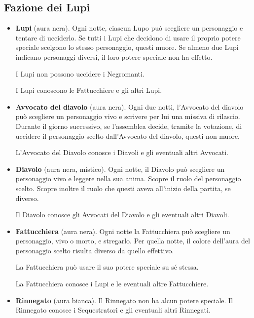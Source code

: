 \documentclass[a4paper,10pt]{article}
\begin{document}
\subsection*{Fazione dei Lupi}

\begin{itemize}
 \item {\bf Lupi} (aura nera). Ogni notte, ciascun Lupo può scegliere un personaggio e tentare di ucciderlo.
 Se tutti i Lupi che decidono di usare il proprio potere speciale scelgono lo stesso personaggio, questi muore.
 Se almeno due Lupi indicano personaggi diversi, il loro potere speciale non ha effetto.
 
 I Lupi non possono uccidere i Negromanti.
 
 I Lupi conoscono le Fattucchiere e gli altri Lupi.

 \item {\bf Avvocato del diavolo} (aura nera). Ogni due notti, l'Avvocato del diavolo può scegliere un personaggio vivo e scrivere per lui una missiva di rilascio.
 Durante il giorno successivo, se l'assemblea decide, tramite la votazione, di uccidere il personaggio scelto dall'Avvocato del diavolo, questi non muore.
  
  L'Avvocato del Diavolo conosce i Diavoli e gli eventuali altri Avvocati.

 \item {\bf Diavolo} (aura nera, mistico). Ogni notte, il Diavolo può scegliere un personaggio vivo e leggere nella sua anima. Scopre il ruolo del personaggio scelto. Scopre inoltre il ruolo che questi aveva all'inizio della partita, se diverso.
 
 Il Diavolo conosce gli Avvocati del Diavolo e gli eventuali altri Diavoli.
 
 \item {\bf Fattucchiera} (aura nera). Ogni notte la Fattucchiera può scegliere un personaggio, vivo o morto, e stregarlo. Per quella notte, il colore dell'aura del personaggio scelto risulta diverso da quello effettivo.
 
 La Fattucchiera può usare il suo potere speciale su sé stessa.
 
 La Fattucchiera conosce i Lupi e le eventuali altre Fattucchiere.
 
 \item {\bf Rinnegato} (aura bianca). Il Rinnegato non ha alcun potere speciale. Il Rinnegato conosce i Sequestratori e gli eventuali altri Rinnegati.


\end{itemize}
\end{document}
